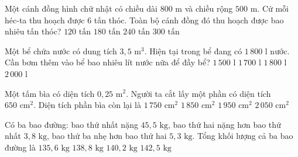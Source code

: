 \begin{ex} %
Một cánh đồng hình chữ nhật có chiều dài $800\text{ m}$ và chiều rộng $500\text{ m}$. Cứ mỗi héc-ta thu hoạch được $6$ tấn thóc. Toàn bộ cánh đồng đó thu hoạch được bao nhiêu tấn thóc?
\choice
{$120\text{ tấn}$}
{$180\text{ tấn}$}
{\True $240\text{ tấn}$}
{$300\text{ tấn}$}
\end{ex}

\begin{ex} %
Một bể chứa nước có dung tích $3{,}5\text{ m}^3$. Hiện tại trong bể đang có $1\,800\text{ l}$ nước. Cần bơm thêm vào bể bao nhiêu lít nước nữa để đầy bể?
\choice
{$1\,500\text{ l}$}
{\True $1\,700\text{ l}$}
{$1\,800\text{ l}$}
{$2\,000\text{ l}$}
\end{ex}

\begin{ex} %
Một tấm bìa có diện tích $0{,}25\text{ m}^2$. Người ta cắt lấy một phần có diện tích $650\text{ cm}^2$. Diện tích phần bìa còn lại là
\choice
{$1\,750\text{ cm}^2$}
{\True $1\,850\text{ cm}^2$}
{$1\,950\text{ cm}^2$}
{$2\,050\text{ cm}^2$}
\end{ex}

\begin{ex} %
Có ba bao đường: bao thứ nhất nặng $45{,}5\text{ kg}$, bao thứ hai nặng hơn bao thứ nhất $3{,}8\text{ kg}$, bao thứ ba nhẹ hơn bao thứ hai $5{,}3\text{ kg}$. Tổng khối lượng cả ba bao đường là
\choice
{$135{,}6\text{ kg}$}
{\True $138{,}8\text{ kg}$}
{$140{,}2\text{ kg}$}
{$142{,}5\text{ kg}$}
\end{ex}

